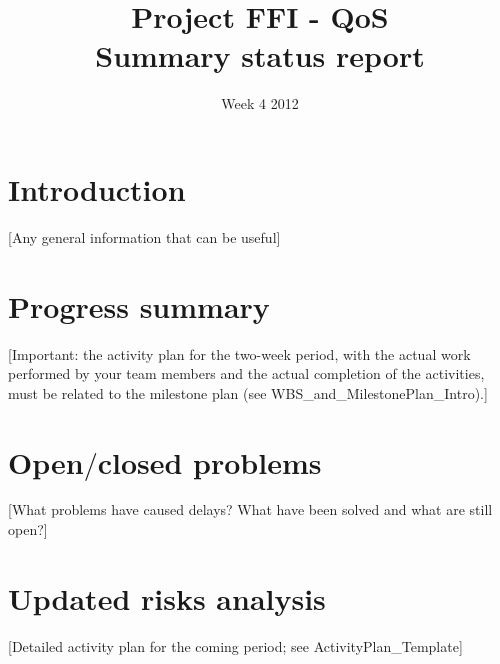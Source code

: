 \documentclass[titlepage]{article}
\title{Project FFI - QoS \\ Summary status report}
\date{Week 4 2012}
\begin{document}
    \maketitle
    \tableofcontents
    \newpage
      
\section{Introduction}
    [Any general information that can be useful]

\section{Progress summary}
    [Important: the activity plan for the two-week period, with the actual work performed by your team members and the actual completion of the activities, must be related to the milestone plan (see WBS_and_MilestonePlan_Intro).] 

\section{Open$/$closed problems}
    [What problems have caused delays? What have been solved and what are still open?]

\section{Updated risks analysis}
    [Detailed activity plan for the coming period; see ActivityPlan_Template]
\end{document}
